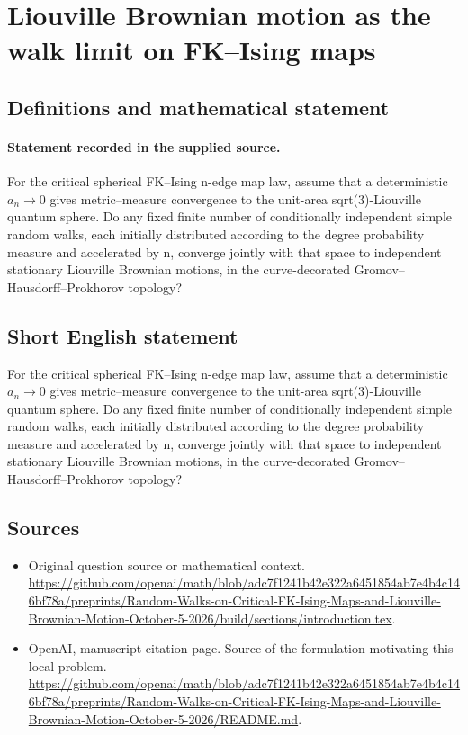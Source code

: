 \documentclass[11pt]{article}
\begin{document}
\section*{Liouville Brownian motion as the walk limit on FK–Ising maps}\label{30007355}
\subsection{Definitions and mathematical statement}
\paragraph{Statement recorded in the supplied source.}
For the critical spherical FK–Ising n-edge map law, assume that a deterministic $a_n\to 0$ gives metric–measure convergence to the unit-area sqrt(3)-Liouville quantum sphere. Do any fixed finite number of conditionally independent simple random walks, each initially distributed according to the degree probability measure and accelerated by n, converge jointly with that space to independent stationary Liouville Brownian motions, in the curve-decorated Gromov–Hausdorff–Prokhorov topology?
\subsection{Short English statement}
For the critical spherical FK–Ising n-edge map law, assume that a deterministic $a_n\to 0$ gives metric–measure convergence to the unit-area sqrt(3)-Liouville quantum sphere. Do any fixed finite number of conditionally independent simple random walks, each initially distributed according to the degree probability measure and accelerated by n, converge jointly with that space to independent stationary Liouville Brownian motions, in the curve-decorated Gromov–Hausdorff–Prokhorov topology?
\subsection{Sources}
\begin{itemize}
\item[S1] Original question source or mathematical context.
\url{https://github.com/openai/math/blob/adc7f1241b42e322a6451854ab7e4b4c146bf78a/preprints/Random-Walks-on-Critical-FK-Ising-Maps-and-Liouville-Brownian-Motion-October-5-2026/build/sections/introduction.tex}.
\item[S2] OpenAI, manuscript citation page. Source of the formulation motivating this local problem.
\url{https://github.com/openai/math/blob/adc7f1241b42e322a6451854ab7e4b4c146bf78a/preprints/Random-Walks-on-Critical-FK-Ising-Maps-and-Liouville-Brownian-Motion-October-5-2026/README.md}.
\end{itemize}
\end{document}
